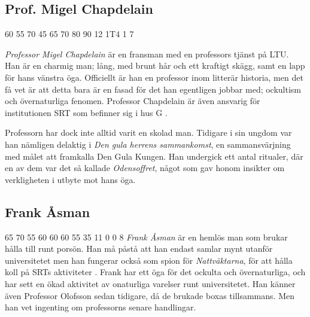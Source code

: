 \subsection{Prof. Migel Chapdelain}
\label{kar:MigelChapdelain}
\character
{60}	%
{55}	%
{70}	%
{45}	%
{65}	%
{70}	%
{80}	%
{90}	%
{12}	%
{1T4}	%
{1}		%
{7}		%
%
{
}
%
{
\textit{Professor Migel Chapdelain} är en fransman med en professors tjänst på LTU. Han är en charmig man; lång, med brunt hår och ett kraftigt skägg, samt en lapp för hans vänstra öga. Officiellt är han en professor inom litterär historia, men det få vet är att detta bara är en fasad för det han egentligen jobbar med; ockultism och övernaturliga fenomen. Professor Chapdelain är även ansvarig för institutionen SRT som befinner sig i hus G \sectiondescribe{\ref{loc:SRT}}.

Professorn har dock inte alltid varit en skolad man. Tidigare i sin ungdom var han nämligen delaktig i \textit{Den gula herrens sammankomst}, en sammansvärjning med målet att framkalla Den Gula Kungen. Han undergick ett antal ritualer, där en av dem var det så kallade \textit{Odensoffret}, något som gav honom insikter om verkligheten i utbyte mot hans öga.
}

\subsection{Frank Åsman}
\label{kar:FrankAsman}
\character
{65}	%
{70}	%
{55}	%
{60}	%
{60}	%
{60}	%
{55}	%
{35}	%
{11}	%
{0}		%
{0}		%
{8}		%
%
{
}
%
{
\textit{Frank Åsman} är en hemlös man som brukar hålla till runt porsön. Han må påstå att han endast samlar mynt utanför 
universitetet men han fungerar också som spion för \textit{Nattväktarna}, för att hålla koll på SRTs 
aktiviteter \sectiondescribe{\ref{loc:SRT}}. Frank har ett öga för det ockulta och övernaturliga, och har sett en ökad 
aktivitet av onaturliga varelser runt universitetet. Han känner även Professor Olofsson sedan tidigare, då de brukade 
boxas tillsammans. Men han vet ingenting om professorns senare handlingar.
}

